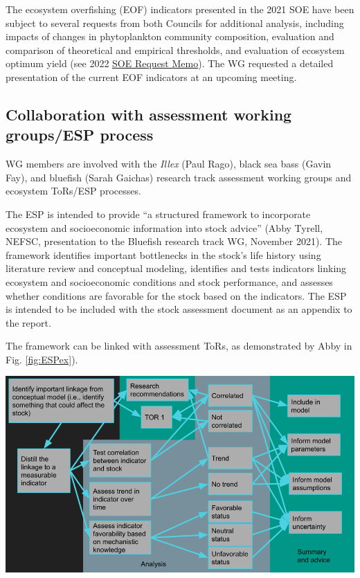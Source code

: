 \documentclass[
  10pt,
]{article}
\let\origfigure\figure
\let\endorigfigure\endfigure
\renewenvironment{figure}[1][2] {
    \expandafter\origfigure\expandafter[H]
} {
    \endorigfigure
}
\begin{document}
The ecosystem overfishing (EOF) indicators presented in the 2021 SOE
have been subject to several requests from both Councils for additional
analysis, including impacts of changes in phytoplankton community
composition, evaluation and comparison of theoretical and empirical
thresholds, and evaluation of ecosystem optimum yield (see 2022
\href{https://www.mafmc.org/s/b_SOE-Cover-letter-and-request-memo.pdf}{SOE
Request Memo}). The WG requested a detailed presentation of the current
EOF indicators at an upcoming meeting.

\hypertarget{collaboration-with-assessment-working-groupsesp-process}{%
\subsection{Collaboration with assessment working groups/ESP
process}\label{collaboration-with-assessment-working-groupsesp-process}}

WG members are involved with the \emph{Illex} (Paul Rago), black sea
bass (Gavin Fay), and bluefish (Sarah Gaichas) research track assessment
working groups and ecosystem ToRs/ESP processes.

The ESP is intended to provide ``a structured framework to incorporate
ecosystem and socioeconomic information into stock advice'' (Abby
Tyrell, NEFSC, presentation to the Bluefish research track WG, November
2021). The framework identifies important bottlenecks in the stock's
life history using literature review and conceptual modeling, identifies
and tests indicators linking ecosystem and socioeconomic conditions and
stock performance, and assesses whether conditions are favorable for the
stock based on the indicators. The ESP is intended to be included with
the stock assessment document as an appendix to the report.

The framework can be linked with assessment ToRs, as demonstrated by
Abby in Fig. \ref{fig:ESPex}).

\begin{figure}

{\centering \includegraphics[width=1\linewidth]{images/bluefish esp update 11-18-21} 

}

\caption{Example flow of information in the bluefish ESP, Abby Tyrell, November 2021}\label{fig:ESPex}
\end{figure}
\end{document}
